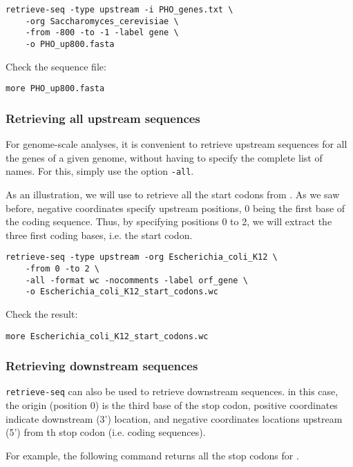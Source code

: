 \begin{verbatim}
retrieve-seq -type upstream -i PHO_genes.txt \
    -org Saccharomyces_cerevisiae \
    -from -800 -to -1 -label gene \
    -o PHO_up800.fasta
\end{verbatim} 

Check the sequence file:

\begin{verbatim}
more PHO_up800.fasta
\end{verbatim}

\subsubsection{Retrieving all upstream sequences}

For genome-scale analyses, it is convenient to retrieve upstream
sequences for all the genes of a given genome, without having to
specify the complete list of names. For this, simply use the option
\texttt{-all}.

As an illustration, we will use \command{retrieve-seq} to retrieve all
the start codons from . As we saw before,
negative coordinates specify upstream positions, 0 being the first
base of the coding sequence. Thus, by specifying positions 0 to 2, we
will extract the three first coding bases, i.e. the start codon. 

\begin{verbatim}
retrieve-seq -type upstream -org Escherichia_coli_K12 \
    -from 0 -to 2 \
    -all -format wc -nocomments -label orf_gene \
    -o Escherichia_coli_K12_start_codons.wc
\end{verbatim}

Check the result:

\begin{verbatim}
more Escherichia_coli_K12_start_codons.wc
\end{verbatim}

\subsubsection{Retrieving downstream sequences}

\texttt{retrieve-seq} can also be used to retrieve downstream
sequences. in this case, the origin (position 0) is the third base of
the stop codon, positive coordinates indicate downstream (3')
location, and negative coordinates locations upstream (5') from th
stop codon (i.e. coding sequences). 

For example, the following command returns all the stop codons for
\organism{Escherichia coli}.

